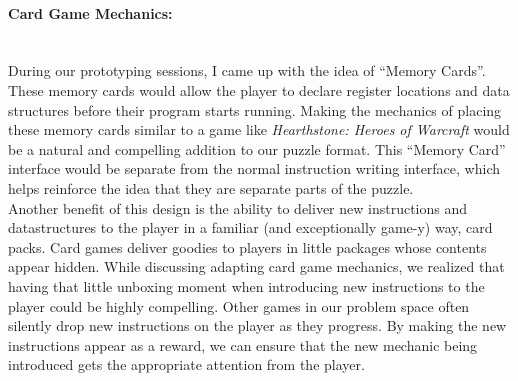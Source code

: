 \paragraph{Card Game Mechanics:}\mbox{} \\
During our prototyping sessions, I came up with the idea of “Memory Cards”.
These memory cards would allow the player to declare register locations and data
structures before their program starts running. Making the mechanics of placing these
memory cards similar to a game like \textit{Hearthstone: Heroes of Warcraft} would be
a natural and compelling addition to our puzzle format. This “Memory Card” interface
would be separate from the normal instruction writing interface, which helps reinforce
the idea that they are separate parts of the puzzle. \\

Another benefit of this design is the ability to deliver new instructions and datastructures
to the player in a familiar (and exceptionally game-y) way, card packs. Card games deliver
goodies to players in little packages whose contents appear hidden. While discussing adapting
card game mechanics, we realized that having that little unboxing moment when introducing new
instructions to the player could be highly compelling. Other games in our problem space often
silently drop new instructions on the player as they progress. By making the new instructions
appear as a reward, we can ensure that the new mechanic being introduced gets the appropriate
attention from the player.

